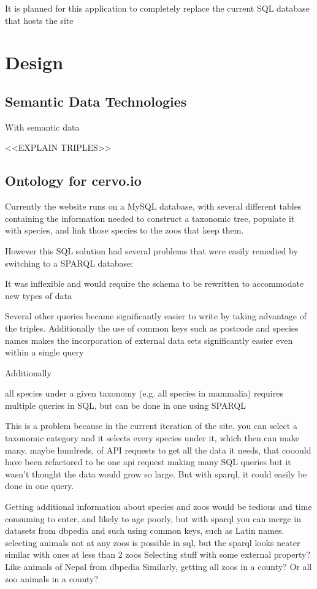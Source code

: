 \documentclass[a4paper]{article}
\begin{document}
It is planned for this application to completely replace the current SQL database that hosts the site

\section{Design}

\subsection{Semantic Data Technologies}
With semantic data

<<EXPLAIN TRIPLES>>



\subsection{Ontology for cervo.io}
Currently the website runs on a MySQL database, with several different tables containing the information needed to construct a taxonomic tree, populate it with species, and link those species to the zoos that keep them. 

However this SQL solution had several problems that were easily remedied by switching to a SPARQL database: 

It was inflexible and would require the schema to be rewritten to accommodate new types of data

Several other queries became significantly easier to write by taking advantage of the triples. Additionally the use of common keys such as postcode and species names makes the incorporation of external data sets significantly easier even within a single query

Additionally 

\iffalse 

all species under a given taxonomy (e.g. all species in mammalia) requires multiple queries in SQL, but can be done in one using SPARQL

This is a problem because in the current iteration of the site, you can select a taxonomic category and it selects every species under it, which then can make many, maybe hundreds, of API requests to get all the data it needs, that cooould have been refactored to be one api request making many SQL queries but it wasn't thought the data would grow so large. But with sparql, it could easily be done in one query. 

Getting additional information about species and zoos would be tedious and time consuming to enter, and likely to age poorly, but with sparql you can merge in datasets from dbpedia and such using common keys, such as Latin names.
selecting animals not at any zoos is possible in sql, but the sparql looks neater
similar with ones at less than 2 zoos
Selecting stuff with some external property? Like animals of Nepal from dbpedia
Similarly, getting all zoos in a county?
Or all zoo animals in a county?
\end{document}
